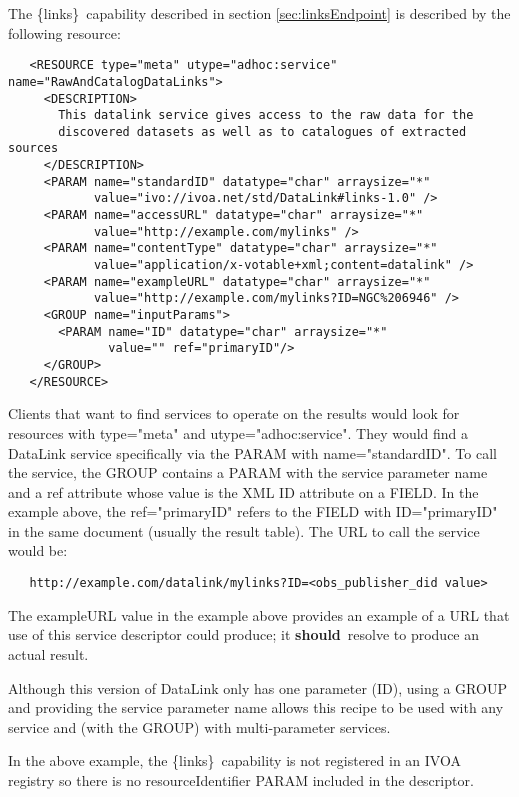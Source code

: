 \documentclass[11pt,a4paper]{ivoa}
\newcommand{\blinks}{\{links\}}
\newcommand{\attval}[2]{#1={\allowbreak}{"}#2{"}}
\newcommand{\rfcshould}{\textbf{should}}
\begin{document}
The \blinks\ capability described in section \ref{sec:linksEndpoint}
is described by the following resource:
\begin{verbatim}
   <RESOURCE type="meta" utype="adhoc:service" name="RawAndCatalogDataLinks">
     <DESCRIPTION>
       This datalink service gives access to the raw data for the
       discovered datasets as well as to catalogues of extracted sources
     </DESCRIPTION>
     <PARAM name="standardID" datatype="char" arraysize="*"
            value="ivo://ivoa.net/std/DataLink#links-1.0" />
     <PARAM name="accessURL" datatype="char" arraysize="*"
            value="http://example.com/mylinks" />
     <PARAM name="contentType" datatype="char" arraysize="*" 
            value="application/x-votable+xml;content=datalink" />
     <PARAM name="exampleURL" datatype="char" arraysize="*" 
            value="http://example.com/mylinks?ID=NGC%206946" />       
     <GROUP name="inputParams">
       <PARAM name="ID" datatype="char" arraysize="*"
              value="" ref="primaryID"/>
     </GROUP>
   </RESOURCE>
\end{verbatim}

Clients that want to find services to operate on the results would look
for resources with \attval{type}{meta} and \attval{utype}{adhoc:service}.
They would find a DataLink service specifically via the PARAM with
\attval{name}{standardID}. To call the service, the GROUP contains a PARAM
with the service parameter name and a ref attribute whose value is the
XML ID attribute on a FIELD. In the example above, the \attval{ref}{primaryID}
refers to the FIELD with \attval{ID}{primaryID} in the same document (usually
the result table). The URL to call the service would be:
\begin{verbatim}
   http://example.com/datalink/mylinks?ID=<obs_publisher_did value>
\end{verbatim}

The exampleURL value in the example above provides an example
of a URL that use of this service descriptor could produce;
it \rfcshould\ resolve to produce an actual result.
 
Although this version of DataLink only has one parameter (ID), using a
GROUP and providing the service parameter name allows this recipe to be
used with any service and (with the GROUP) with multi-parameter services.

In the above example, the \blinks\ capability is not registered in an
IVOA registry so there is no resourceIdentifier PARAM included in the
descriptor.
\end{document}
